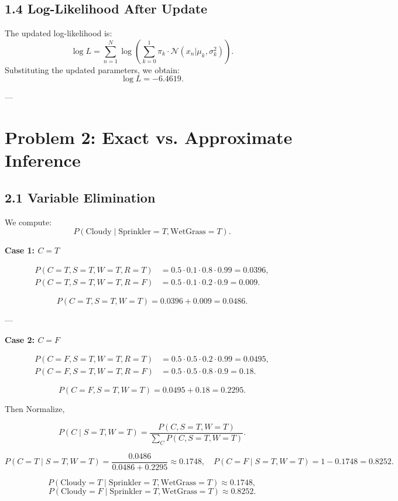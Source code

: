 \documentclass[11pt]{article}
\begin{document}
\subsection*{1.4 Log-Likelihood After Update}
The updated log-likelihood is:
\[
\log L = \sum_{n=1}^N \log \left( \sum_{k=0}^1 \pi_k \cdot \mathcal{N}(x_n | \mu_k, \sigma_k^2) \right).
\]
Substituting the updated parameters, we obtain:
\[
\log L = -6.4619.
\]

---

\section*{Problem 2: Exact vs. Approximate Inference}

\subsection*{2.1 Variable Elimination}

We compute:
\[
P(\text{Cloudy} \mid \text{Sprinkler} = T, \text{WetGrass} = T).
\]

\textbf{Case 1: \( C = T \)}

\[
\begin{aligned}
P(C = T, S = T, W = T, R = T) &= 0.5 \cdot 0.1 \cdot 0.8 \cdot 0.99 = 0.0396, \\
P(C = T, S = T, W = T, R = F) &= 0.5 \cdot 0.1 \cdot 0.2 \cdot 0.9 = 0.009.
\end{aligned}
\]

\[
P(C = T, S = T, W = T) = 0.0396 + 0.009 = 0.0486.
\]

---

\textbf{Case 2: \( C = F \)}

\[
\begin{aligned}
P(C = F, S = T, W = T, R = T) &= 0.5 \cdot 0.5 \cdot 0.2 \cdot 0.99 = 0.0495, \\
P(C = F, S = T, W = T, R = F) &= 0.5 \cdot 0.5 \cdot 0.8 \cdot 0.9 = 0.18.
\end{aligned}
\]

\[
P(C = F, S = T, W = T) = 0.0495 + 0.18 = 0.2295.
\]

Then Normalize,

\[
P(C \mid S = T, W = T) = \frac{P(C, S = T, W = T)}{\sum_C P(C, S = T, W = T)}.
\]

\[
P(C = T \mid S = T, W = T) = \frac{0.0486}{0.0486 + 0.2295} \approx 0.1748, \quad
P(C = F \mid S = T, W = T) = 1 - 0.1748 = 0.8252.
\]

\[
P(\text{Cloudy} = T \mid \text{Sprinkler} = T, \text{WetGrass} = T) \approx 0.1748,
\]
\[
P(\text{Cloudy} = F \mid \text{Sprinkler} = T, \text{WetGrass} = T) \approx 0.8252.
\]
\end{document}

